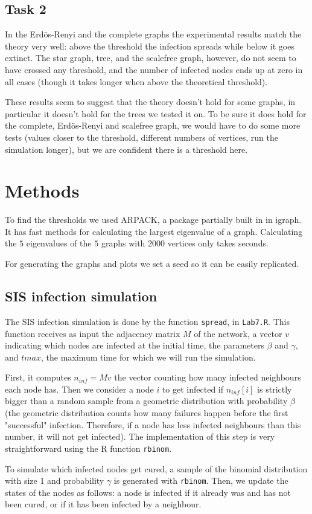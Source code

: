 \documentclass[paper=a4, fontsize=11pt]{scrartcl} %
\begin{document}
\subsection{Task 2}
In the Erdös-Renyi and the complete graphs the experimental results match the theory very well: above the threshold the infection spreads while below it goes extinct. The star graph, tree, and the scalefree graph, however, do not seem to have crossed any threshold, and the number of infected nodes ends up at zero in all cases (though it takes longer when above the theoretical threshold).

These results seem to suggest that the theory doesn't hold for some graphs, in particular it doesn't hold for the trees we tested it on. To be sure it does hold for the complete, Erdös-Renyi and scalefree graph, we would have to do some more tests (values closer to the threshold, different numbers of vertices, run the simulation longer), but we are confident there is a threshold here.

\section{Methods}
To find the thresholds we used ARPACK, a package partially built in in igraph. It has fast methods for calculating the largest eigenvalue of a graph. Calculating the $5$ eigenvalues of the $5$ graphs with $2000$ vertices only takes seconds.

For generating the graphs and plots we set a seed so it can be easily replicated.

\subsection{SIS infection simulation}
The SIS infection simulation is done by the function \texttt{spread}, in \texttt{Lab7.R}. This function receives as input the adjacency matrix $M$ of the network, a vector $v$ indicating which nodes are infected at the initial time, the parameters $\beta$ and $\gamma$, and $tmax$, the maximum time for which we will run the simulation. 

First, it computes $n_{inf}=M v$ the vector counting how many infected neighbours each node has. Then we consider a node $i$ to get infected if $n_{inf}[i]$ is strictly bigger than a random sample from a geometric distribution with probability $\beta$ (the geometric distribution counts how many failures happen before the first "successful" infection. Therefore, if a node has less infected neighbours than this number, it will not get infected). The implementation of this step is very straightforward using the R function \texttt{rbinom}.

To simulate which infected nodes get cured, a sample of the binomial distribution with size 1 and probability $\gamma$ is generated with \texttt{rbinom}. Then, we update the states of the nodes as follows: a node is infected if it already was and has not been cured, or if it has been infected by a neighbour.
\end{document}

